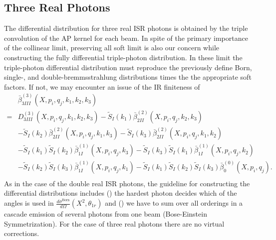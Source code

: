 \subsection{Three Real Photons}
The differential distribution for three real ISR photons is obtained by the triple convolution of the AP kernel for each beam. In spite of the primary importance of the collinear limit, preserving all soft limit is also our concern while constructing the fully differential triple-photon distribution. In these limit the triple-photon differential distribution must reproduce the previously define Born, single-, and double-bremmsstrahlung distributions times the the appropriate soft factors. If not, we may encounter an issue of the IR finiteness of
\begin{align}
&\bar{\beta}^{(3)}_{3III}(X,p_i,q_j,k_1,k_2,k_3)\nonumber\\
=&D^{(3)}_{3III}(X,p_i,q_j,k_1,k_2,k_3)-\widetilde{S}_I(k_1)\bar{\beta}^{(2)}_{2II}(X,p_i,q_j,k_2,k_3)\nonumber\\
&-\widetilde{S}_I(k_2)\bar{\beta}^{(2)}_{2II}(X,p_i,q_j,k_1,k_3)
-\widetilde{S}_I(k_3)\bar{\beta}^{(2)}_{2II}(X,p_i,q_j,k_1,k_2)\nonumber\\
&-\widetilde{S}_I(k_1)\widetilde{S}_I(k_2)\bar{\beta}^{(1)}_{1I}(X,p_i,q_j,k_3)-\widetilde{S}_I(k_3)\widetilde{S}_I(k_1)\bar{\beta}^{(1)}_{1I}(X,p_i,q_j,k_2)\nonumber\\
&-\widetilde{S}_I(k_2)\widetilde{S}_I(k_3)\bar{\beta}^{(1)}_{1I}(X,p_i,q_j,k_1)-\widetilde{S}_I(k_1)\widetilde{S}_I(k_2)\widetilde{S}_I(k_3)\bar{\beta}^{(0)}_{0}(X,p_i,q_j).\nonumber\\
\end{align}
As in the case of the double real ISR photons, the guideline for constructing the differential distributions includes () the hardest photon decides which of the angles is used in $\frac{d\sigma^\text{Born}}{d\Omega}(X^2,\theta_{1r})$
and () we have to sum over all orderings in a cascade emission of several photons from one beam (Bose-Einstein Symmetrization). For the case of three real photons there are no virtual corrections.


